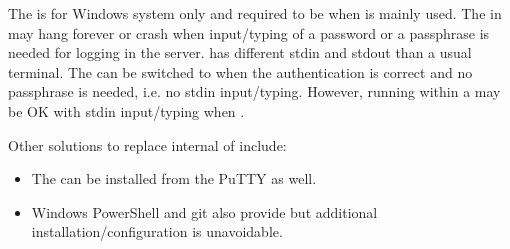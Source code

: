 The  is for Windows system only and
required to be  when  is mainly used. The
 in  may hang forever or crash when input/typing of a
password or a passphrase is needed for logging in the server.
 has different stdin and stdout than a usual terminal.
The  can be switched to  when
the authentication is correct and no passphrase is needed, i.e.
{\color{red} no stdin input/typing. }
However,  running within a  may be OK with stdin
input/typing when .

Other solutions to replace internal  of 
include:
\begin{itemize}
\item
The  can be installed from the PuTTY as well.
\item
Windows PowerShell and git also provide  but
additional installation/configuration is unavoidable.
\end{itemize}


